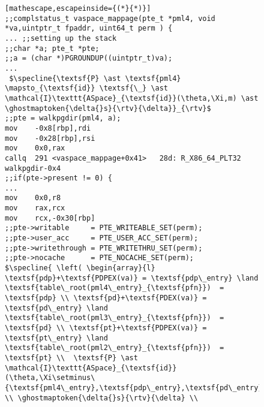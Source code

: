 \begin{figure}\footnotesize
  \begin{lstlisting}[mathescape,escapeinside={(*}{*)}]
;;complstatus_t vaspace_mappage(pte_t *pml4, void *va,uintptr_t fpaddr, uint64_t perm ) {
... ;;setting up the stack      
;;char *a; pte_t *pte;
;;a = (char *)PGROUNDUP((uintptr_t)va);
...
 $\specline{\textsf{P} \ast \textsf{pml4} \mapsto_{\textsf{id}} \textsf{\_} \ast \mathcal{I}\texttt{ASpace}_{\textsf{id}}(\theta,\Xi,m) \ast \ghostmaptoken{\delta{}s}{\rtv}{\delta}}_{\rtv}$      
;;pte = walkpgdir(pml4, a);
mov    -0x8[rbp],rdi
mov    -0x28[rbp],rsi
mov    0x0,rax
callq  291 <vaspace_mappage+0x41>	28d: R_X86_64_PLT32	walkpgdir-0x4
;;if(pte->present != 0) {
...        
mov    0x0,r8
mov    rax,rcx
mov    rcx,-0x30[rbp]
;;pte->writable     = PTE_WRITEABLE_SET(perm);
;;pte->user_acc     = PTE_USER_ACC_SET(perm);
;;pte->writethrough = PTE_WRITETHRU_SET(perm);
;;pte->nocache      = PTE_NOCACHE_SET(perm);
$\specline{ \left( \begin{array}{l} \textsf{pdp}+\textsf{PDPEX(va)} = \textsf{pdp\_entry} \land \textsf{table\_root(pml4\_entry}_{\textsf{pfn}})  = \textsf{pdp} \\ \textsf{pd}+\textsf{PDEX(va)} = \textsf{pd\_entry} \land \textsf{table\_root(pml3\_entry}_{\textsf{pfn}})  = \textsf{pd} \\ \textsf{pt}+\textsf{PDPEX(va)} = \textsf{pt\_entry} \land \textsf{table\_root(pml2\_entry}_{\textsf{pfn}})  = \textsf{pt} \\  \textsf{P} \ast \mathcal{I}\texttt{ASpace}_{\textsf{id}}(\theta,\Xi\setminus\{\textsf{pml4\_entry},\textsf{pdp\_entry},\textsf{pd\_entry},\textsf{pt\_entry}\},m)  \\ \ghostmaptoken{\delta{}s}{\rtv}{\delta} \\

\end{lstlisting}
\end{figure}
